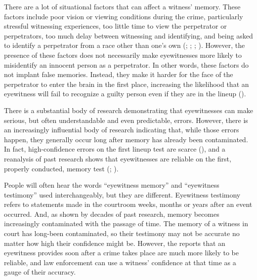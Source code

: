 \documentclass[
]{krantz}
\begin{document}
There are a lot of situational factors that can affect a witness' memory. These factors include poor vision or viewing conditions during the crime, particularly stressful witnessing experiences, too little time to view the perpetrator or perpetrators, too much delay between witnessing and identifying, and being asked to identify a perpetrator from a race other than one's own (; ; ; ). However, the presence of these factors does not necessarily make eyewitnesses more likely to misidentify an innocent person as a perpetrator. In other words, these factors do not implant false memories. Instead, they make it harder for the face of the perpetrator to enter the brain in the first place, increasing the likelihood that an eyewitness will fail to recognize a guilty person even if they are in the lineup ().

There is a substantial body of research demonstrating that eyewitnesses can make serious, but often understandable and even predictable, errors. However, there is an increasingly influential body of research indicating that, while those errors happen, they generally occur long after memory has already been contaminated. In fact, high-confidence errors on the first lineup test are scarce (), and a reanalysis of past research shows that eyewitnesses are reliable on the first, properly conducted, memory test (; ).

People will often hear the words ``eyewitness memory'' and ``eyewitness testimony'' used interchangeably, but they are different. Eyewitness testimony refers to statements made in the courtroom weeks, months or years after an event occurred. And, as shown by decades of past research, memory becomes increasingly contaminated with the passage of time. The memory of a witness in court has long-been contaminated, so their testimony may not be accurate no matter how high their confidence might be. However, the reports that an eyewitness provides soon after a crime takes place are much more likely to be reliable, and law enforcement can use a witness' confidence at that time as a gauge of their accuracy.
\end{document}
